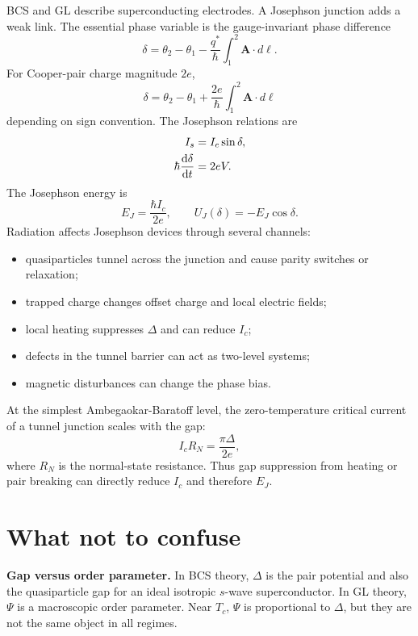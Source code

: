 \documentclass[11pt]{article}
\numberwithin{equation}{section}
\newcommand{\Avec}{\bm{A}}
\begin{document}
BCS and GL describe superconducting electrodes. A Josephson junction adds a weak link. The essential phase variable is the gauge-invariant phase difference
\begin{equation}
\delta=\theta_2-\theta_1-\frac{q^*}{\hbar}\int_1^2\Avec\cdot d\bm{\ell}.
\end{equation}
For Cooper-pair charge magnitude $2e$,
\begin{equation}
\delta=\theta_2-\theta_1+\frac{2e}{\hbar}\int_1^2\Avec\cdot d\bm{\ell}
\end{equation}
depending on sign convention. The Josephson relations are
\begin{align}
I_s&=I_c\sin\delta,\\
\hbar\dv{\delta}{t}&=2eV.
\end{align}
The Josephson energy is
\begin{equation}
E_J=\frac{\hbar I_c}{2e},
\qquad
U_J(\delta)=-E_J\cos\delta.
\end{equation}
Radiation affects Josephson devices through several channels:
\begin{itemize}[leftmargin=2em]
\item quasiparticles tunnel across the junction and cause parity switches or relaxation;
\item trapped charge changes offset charge and local electric fields;
\item local heating suppresses $\Delta$ and can reduce $I_c$;
\item defects in the tunnel barrier can act as two-level systems;
\item magnetic disturbances can change the phase bias.
\end{itemize}
At the simplest Ambegaokar-Baratoff level, the zero-temperature critical current of a tunnel junction scales with the gap:
\begin{equation}
I_c R_N=\frac{\pi\Delta}{2e},
\end{equation}
where $R_N$ is the normal-state resistance. Thus gap suppression from heating or pair breaking can directly reduce $I_c$ and therefore $E_J$.

\section{What not to confuse}

\begin{physicsbox}
\textbf{Gap versus order parameter.} In BCS theory, $\Delta$ is the pair potential and also the quasiparticle gap for an ideal isotropic $s$-wave superconductor. In GL theory, $\Psi$ is a macroscopic order parameter. Near $T_c$, $\Psi$ is proportional to $\Delta$, but they are not the same object in all regimes.
\end{physicsbox}
\end{document}
